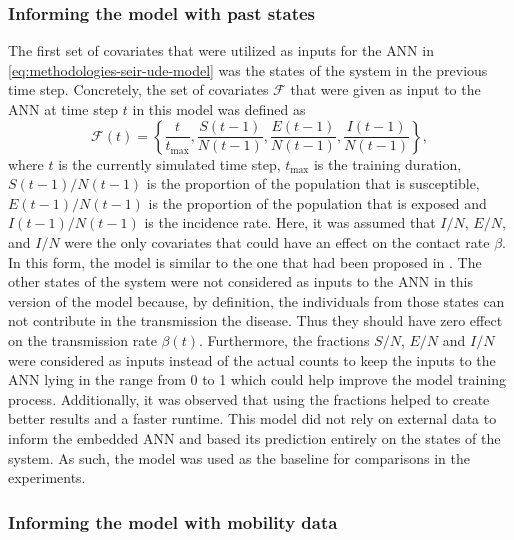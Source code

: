 \subsubsection{Informing the model with past states}
The first set of covariates that were utilized as inputs for the \gls{ANN} in \autoref{eq:methodologies-seir-ude-model} was the states of the system in the previous time step.
Concretely, the set of covariates $\mathcal{F}$ that were given as input to the \gls{ANN} at time step $t$ in this model was defined as
\begin{equation*}
    \mathcal{F}(t) = \left\lbrace \frac{t}{t_\text{max}}, \frac{S(t-1)}{N(t-1)}, \frac{E(t-1)}{N(t-1)}, \frac{I(t-1)}{N(t-1)} \right\rbrace,
\end{equation*}
where $t$ is the currently simulated time step, $t_\text{max}$ is the training duration, $S(t-1)/N(t-1)$ is the proportion of the population that is susceptible, $E(t-1)/N(t-1)$ is the proportion of the population that is exposed and $I(t-1)/N(t-1)$ is the incidence rate.
Here, it was assumed that $I/N$, $E/N$, and $I/N$ were the only covariates that could have an effect on the contact rate $\beta$.
In this form, the model is similar to the one that had been proposed in \cite{dandekarMachineLearningAidedGlobal2020a}.
The other states of the system were not considered as inputs to the \gls{ANN} in this version of the model because, by definition, the individuals from those states can not contribute in the transmission the disease.
Thus they should have zero effect on the transmission rate $\beta(t)$.
Furthermore, the fractions $S/N$, $E/N$ and $I/N$ were considered as inputs instead of the actual counts to keep the inputs to the \gls{ANN} lying in the range from 0 to 1 which could help improve the model training process.
Additionally, it was observed that using the fractions helped to create better results and a faster runtime.
This model did not rely on external data to inform the embedded \gls{ANN} and based its prediction entirely on the states of the system.
As such, the model was used as the baseline for comparisons in the experiments.

\subsubsection{Informing the model with mobility data}

